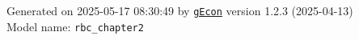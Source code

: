 \documentclass[10pt,a4paper]{article}
\numberwithin{equation}{section}
\begin{document}
\begin{flushleft}{\large
Generated  on 2025-05-17 08:30:49 by \href{http://gecon.r-forge.r-project.org/}{\texttt{gEcon}} version 1.2.3 (2025-04-13)\\
Model name: \verb+rbc_chapter2+
}\end{flushleft}



\end{document}
